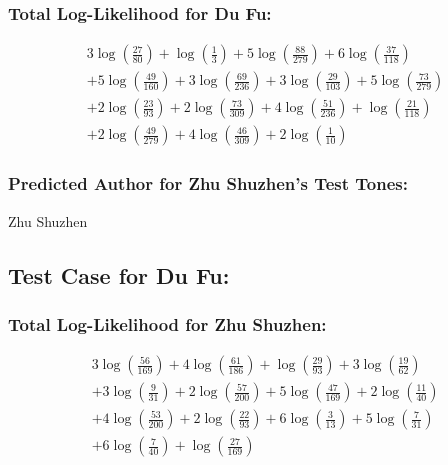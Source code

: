 \documentclass[12pt]{article}
\begin{document}
\subsubsection*{Total Log-Likelihood for Du Fu:}

\begin{align*}
& 3 \log\left(\frac{27}{80}\right) + \log\left(\frac{1}{3}\right) + 5 \log\left(\frac{88}{279}\right) + 6 \log\left(\frac{37}{118}\right) \\
& + 5 \log\left(\frac{49}{160}\right) + 3 \log\left(\frac{69}{236}\right) + 3 \log\left(\frac{29}{103}\right) + 5 \log\left(\frac{73}{279}\right) \\
& + 2 \log\left(\frac{23}{93}\right) + 2 \log\left(\frac{73}{309}\right) + 4 \log\left(\frac{51}{236}\right) + \log\left(\frac{21}{118}\right) \\
& + 2 \log\left(\frac{49}{279}\right) + 4 \log\left(\frac{46}{309}\right) + 2 \log\left(\frac{1}{10}\right)
\end{align*}

\subsubsection*{Predicted Author for Zhu Shuzhen's Test Tones:}
Zhu Shuzhen

\subsection*{Test Case for Du Fu: }

\subsubsection*{Total Log-Likelihood for Zhu Shuzhen:}

\[
\begin{aligned}
    &3 \log\left(\frac{56}{169}\right) + 4 \log\left(\frac{61}{186}\right) + \log\left(\frac{29}{93}\right) + 3 \log\left(\frac{19}{62}\right) \\
    &+ 3 \log\left(\frac{9}{31}\right) + 2 \log\left(\frac{57}{200}\right) + 5 \log\left(\frac{47}{169}\right) + 2 \log\left(\frac{11}{40}\right) \\
    &+ 4 \log\left(\frac{53}{200}\right) + 2 \log\left(\frac{22}{93}\right) + 6 \log\left(\frac{3}{13}\right) + 5 \log\left(\frac{7}{31}\right) \\
    &+ 6 \log\left(\frac{7}{40}\right) + \log\left(\frac{27}{169}\right)
\end{aligned}
\]
\end{document}
